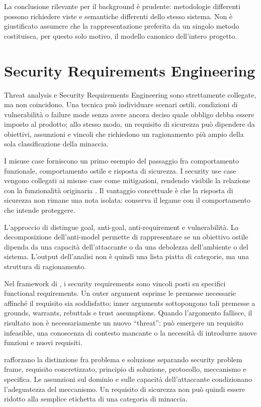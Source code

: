\documentclass[12pt,a4paper,oneside]{report}
\begin{document}
La conclusione rilevante per il background è prudente: metodologie differenti possono richiedere viste e semantiche differenti dello stesso sistema. Non è giustificato assumere che la rappresentazione preferita da un singolo metodo costituisca, per questo solo motivo, il modello canonico dell'intero progetto.

\section{Security Requirements Engineering}

Threat analysis e Security Requirements Engineering sono strettamente collegate, ma non coincidono. Una tecnica può individuare scenari ostili, condizioni di vulnerabilità o failure mode senza avere ancora deciso quale obbligo debba essere imposto al prodotto; allo stesso modo, un requisito di sicurezza può dipendere da obiettivi, assunzioni e vincoli che richiedono un ragionamento più ampio della sola classificazione della minaccia.

I misuse case forniscono un primo esempio del passaggio fra comportamento funzionale, comportamento ostile e risposta di sicurezza. I security use case vengono collegati ai misuse case come mitigazioni, rendendo visibile la relazione con la funzionalità originaria \citep{sindre2005eliciting}. Il vantaggio concettuale è che la risposta di sicurezza non rimane una nota isolata: conserva il legame con il comportamento che intende proteggere.

L'approccio di \citet{vanlamsweerde2004elaborating} distingue goal, anti-goal, anti-requirement e vulnerabilità. La decomposizione dell'anti-model permette di rappresentare se un obiettivo ostile dipenda da una capacità dell'attaccante o da una debolezza dell'ambiente o del sistema. L'output dell'analisi non è quindi una lista piatta di categorie, ma una struttura di ragionamento.

Nel framework di \citet{haley2008securityrequirements}, i security requirements sono vincoli posti su specifici functional requirements. Un outer argument esprime le premesse necessarie affinché il requisito sia soddisfatto; inner arguments sottopongono tali premesse a grounds, warrants, rebuttals e trust assumptions. Quando l'argomento fallisce, il risultato non è necessariamente un nuovo ``threat'': può emergere un requisito infeasible, una conoscenza di contesto mancante o la necessità di introdurre nuove funzioni e nuovi requisiti.

\citet{hatebur2006securityengineering} rafforzano la distinzione fra problema e soluzione separando security problem frame, requisito concretizzato, principio di soluzione, protocollo, meccanismo e specifica. Le assunzioni sul dominio e sulle capacità dell'attaccante condizionano l'adeguatezza del meccanismo. Un requisito di sicurezza non può quindi essere ridotto alla semplice etichetta di una categoria di minaccia.
\end{document}
